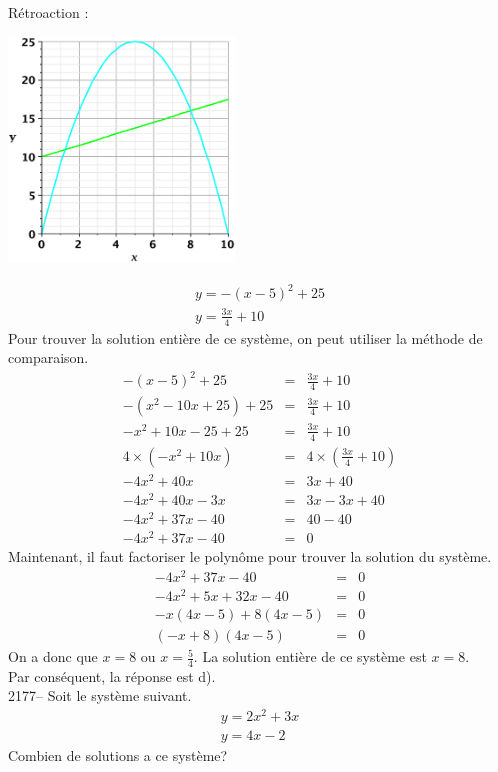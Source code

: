 \documentclass[letterpaper, 12pt]{article}
\begin{document}
R\'etroaction :\\
\begin{center}
 \includegraphics[width=6cm,bb=20 118 575 673]{Q2176.eps}
\end{center}
\begin{eqnarray*}
 y=-(x-5)^{2}+25\\
y=\frac{3x}{4}+10
\end{eqnarray*}
Pour trouver la solution enti\`ere de ce syst\`eme, on peut utiliser la m\'ethode de comparaison.
\begin{eqnarray*}
 -(x-5)^{2}+25&=&\frac{3x}{4}+10\\[2mm]
 -(x^{2}-10x+25)+25&=&\frac{3x}{4}+10\\[2mm]
 -x^{2}+10x-25+25&=&\frac{3x}{4}+10\\[2mm]
 4\times(-x^{2}+10x)&=&4\times(\frac{3x}{4}+10)\\[2mm]
-4x^{2}+40x&=&3x+40\\
-4x^{2}+40x-3x&=&3x-3x+40\\
-4x^{2}+37x-40&=&40-40\\
-4x^{2}+37x-40&=&0
\end{eqnarray*}
Maintenant, il faut factoriser le polyn\^ome pour trouver la solution du syst\`eme.
\begin{eqnarray*}
 -4x^{2}+37x-40&=&0\\
 -4x^{2}+5x+32x-40&=&0\\
 -x(4x-5)+8(4x-5)&=&0\\
 (-x+8)(4x-5)&=&0
\end{eqnarray*}
On a donc que $x=8$ ou $x=\frac{5}{4}$. La solution enti\`ere de ce syst\`eme est $x=8$. \\
Par cons\'equent, la r\'eponse est d).\\

2177-- Soit le syst\`eme suivant.
\begin{eqnarray*}
 y=2x^{2}+3x\\
y=4x-2
\end{eqnarray*}
Combien de solutions a ce syst\`eme?\\
\end{document}

